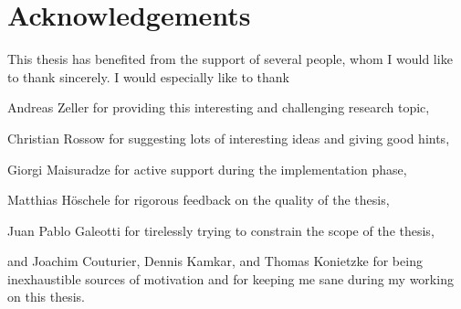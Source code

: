 \section*{Acknowledgements}
This thesis has benefited from the support of several people, whom I would like to thank sincerely.
I would especially like to thank
\begin{description*}
	\item[] Andreas Zeller for providing this interesting and challenging research topic,
	\item[] Christian Rossow for suggesting lots of interesting ideas and giving good hints,
	\item[] Giorgi Maisuradze for active support during the implementation phase,
	\item[] Matthias Höschele for rigorous feedback on the quality of the thesis,
	\item[] Juan Pablo Galeotti for tirelessly trying to constrain the scope of the thesis,
	\item[] and Joachim Couturier, Dennis Kamkar, and Thomas Konietzke for being inexhaustible sources
	of motivation and for keeping me sane during my working on this thesis.
\end{description*}